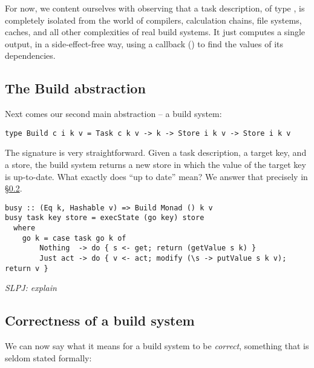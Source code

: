 For now, we content ourselves with observing that a task description,
of type , is completely isolated from the world of
compilers, calculation chains, file systems, caches, and all other
complexities of real build systems.  It just computes a single output, in
a side-effect-free way, using a callback () to find the values
of its dependencies.

\subsection{The Build abstraction}\label{sec-general-build}

Next comes our second main abstraction -- a build system:
\vspace{1mm}
\begin{verbatim}
type Build c i k v = Task c k v -> k -> Store i k v -> Store i k v
\end{verbatim}
\vspace{1mm}
The signature is very straightforward.  Given a task description, a target key,
and a store, the build system returns a new store in which the value of the
target key is up-to-date. What exactly does ``up to date'' mean?  We answer
that precisely in \S\ref{sec-build-correctness}.

\vspace{1mm}
\begin{verbatim}
busy :: (Eq k, Hashable v) => Build Monad () k v
busy task key store = execState (go key) store
  where
    go k = case task go k of
        Nothing  -> do { s <- get; return (getValue s k) }
        Just act -> do { v <- act; modify (\s -> putValue s k v); return v }
\end{verbatim}
\vspace{1mm}

\emph{SLPJ: explain}

\subsection{Correctness of a build system} \label{sec-build-correctness}

We can now say what it means for a build system to be \emph{correct}, something
that is seldom stated formally:

